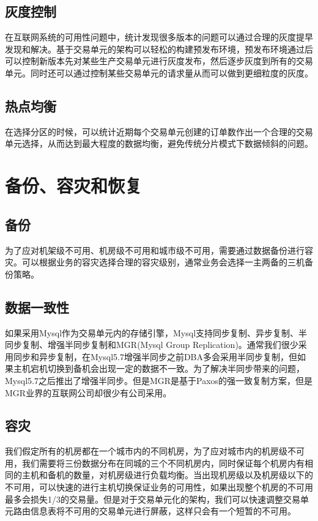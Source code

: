 \documentclass[letterpaper,twocolumn,10pt]{article}
\begin{document}
\subsection {灰度控制}
在互联网系统的可用性问题中，统计发现很多版本的问题可以通过合理的灰度提早发现和解决。基于交易单元的架构可以轻松的构建预发布环境，预发布环境通过后可以控制新版本先对某些生产交易单元进行灰度发布，然后逐步灰度到所有的交易单元。同时还可以通过控制某些交易单元的请求量从而可以做到更细粒度的灰度。

\subsection{热点均衡}
在选择分区的时候，可以统计近期每个交易单元创建的订单数作出一个合理的交易单元选择，从而达到最大程度的数据均衡，避免传统分片模式下数据倾斜的问题。

\section{备份、容灾和恢复}

\subsection{备份}
为了应对机架级不可用、机房级不可用和城市级不可用，需要通过数据备份进行容灾。可以根据业务的容灾选择合理的容灾级别，通常业务会选择一主两备的三机备份策略。

\subsection{数据一致性}
如果采用Mysql作为交易单元内的存储引擎，Mysql支持同步复制、异步复制、半同步复制、增强半同步复制和MGR(Mysql Group Replication)。通常我们很少采用同步和异步复制，在Mysql5.7增强半同步之前DBA多会采用半同步复制，但如果主机宕机切换到备机会出现一定的数据不一致。为了解决半同步带来的问题，Mysql5.7之后推出了增强半同步。但是MGR是基于Paxos的强一致复制方案，但是MGR业界的互联网公司却很少有公司采用。

\subsection {容灾}
我们假定所有的机房都在一个城市内的不同机房，为了应对城市内的机房级不可用，我们需要将三份数据分布在同城的三个不同机房内，同时保证每个机房内有相同的主机和备机的数量，对机房级进行负载均衡。当出现机房级以及机房级以下的不可用，可以快速的进行主机切换保证业务的可用性，如果出现整个机房的不可用最多会损失1/3的交易量。但是对于交易单元化的架构，我们可以快速调整交易单元路由信息表将不可用的交易单元进行屏蔽，这样只会有一个短暂的不可用。
\end{document}
